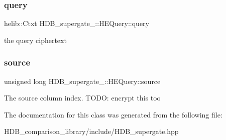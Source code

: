 \subsubsection{\texorpdfstring{query}{query}}
{\footnotesize\ttfamily helib\+::\+Ctxt H\+D\+B\+\_\+supergate\+\_\+\+::\+H\+E\+Query\+::query}

the query ciphertext \mbox{\label{classHDB__supergate___1_1HEQuery_ad838cd0c6b56ca367effa1f1756e3fe5}} 
\subsubsection{\texorpdfstring{source}{source}}
{\footnotesize\ttfamily unsigned long H\+D\+B\+\_\+supergate\+\_\+\+::\+H\+E\+Query\+::source}

The source column index. T\+O\+DO\+: encrypt this too 

The documentation for this class was generated from the following file\+:\begin{DoxyCompactItemize}
\item 
H\+D\+B\+\_\+comparison\+\_\+library/include/H\+D\+B\+\_\+supergate.\+hpp\end{DoxyCompactItemize}
